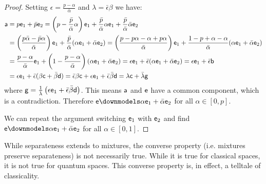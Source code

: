 \begin{mathSection}
\begin{proof}
	Setting $\epsilon = \frac{p - \alpha}{\bar{\alpha}}$ and $\lambda = \bar{\epsilon} \beta$ we have:
	\begin{align*}
		\ens[a] &= p \ens_1 + \bar{p} \ens_2 = \left(p - \frac{\bar{p}}{\bar{\alpha}} \alpha \right) \ens_1 + \frac{\bar{p}}{\bar{\alpha}} \alpha \ens_1 + \frac{\bar{p}}{\bar{\alpha}} \bar{\alpha}\ens_2 \\
		&= \left(\frac{p\bar{\alpha} - \bar{p}\alpha}{\bar{\alpha}} \right) \ens_1 + \frac{\bar{p}}{\bar{\alpha}} (\alpha \ens_1 + \bar{\alpha} \ens_2) = \left(\frac{p - p\alpha - \alpha + p \alpha}{\bar{\alpha}} \right) \ens_1 + \frac{1 - p + \alpha - \alpha}{\bar{\alpha}} (\alpha \ens_1 + \bar{\alpha} \ens_2) \\
		&= \frac{p - \alpha}{\bar{\alpha}}  \ens_1 + \left( 1 - \frac{p - \alpha}{\bar{\alpha}}\right) (\alpha \ens_1 + \bar{\alpha} \ens_2) = \epsilon \ens_1 + \bar{\epsilon} (\alpha \ens_1 + \bar{\alpha} \ens_2) = \epsilon \ens_1 + \bar{\epsilon} \ens[b] \\
		&= \epsilon \ens_1 + \bar{\epsilon} ( \beta \ens[c] + \bar{\beta} \ens[d] ) = \bar{\epsilon} \beta \ens[c] + \epsilon \ens_1 + \bar{\epsilon} \bar{\beta} \ens[d] = \lambda \ens[c] + \bar{\lambda} \ens[g]
	\end{align*}
	where $\ens[g] = \frac{1}{\bar{\lambda}}\left( \epsilon \ens_1 + \bar{\epsilon} \bar{\beta} \ens[d] \right)$. This means $\ens[a]$ and $\ens$ have a common component, which is a contradiction. Therefore $\ens \separate \alpha \ens_1 + \bar{\alpha} \ens_2$ for all $\alpha \in [0, p]$.
	
	We can repeat the argument switching $\ens_1$ with $\ens_2$ and find $\ens \separate \alpha \ens_1 + \bar{\alpha} \ens_2$ for all $\alpha \in [0, 1]$.
\end{proof}

\end{mathSection}

While separateness extends to mixtures, the converse property (i.e. mixtures preserve separateness) is not necessarily true. While it is true for classical spaces, it is not true for quantum spaces. This converse property is, in effect, a telltale of classicality.

